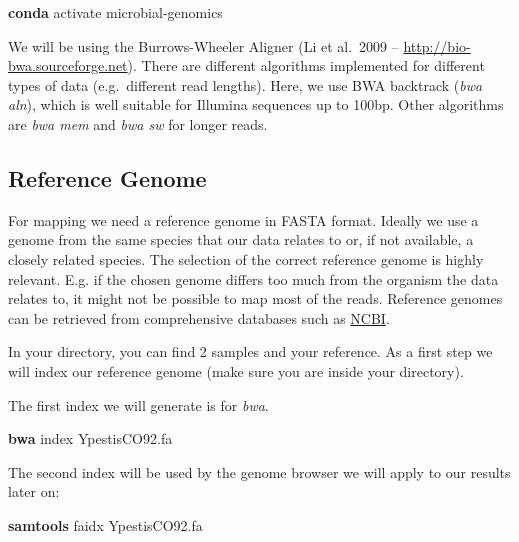 \documentclass[
  letterpaper,
]{book}
\newenvironment{Shaded}{}{}
\newcommand{\ExtensionTok}[1]{\textcolor[rgb]{0.84,0.23,0.29}{\textbf{#1}}}
\newcommand{\NormalTok}[1]{\textcolor[rgb]{0.14,0.16,0.18}{#1}}
\begin{document}
\begin{Shaded}
\begin{Highlighting}[]
\ExtensionTok{conda}\NormalTok{ activate microbial{-}genomics}
\end{Highlighting}
\end{Shaded}

We will be using the Burrows-Wheeler Aligner (Li et al.~2009 --
\url{http://bio-bwa.sourceforge.net}). There are different algorithms
implemented for different types of data (e.g.~different read lengths).
Here, we use BWA backtrack (\emph{bwa aln}), which is well suitable for
Illumina sequences up to 100bp. Other algorithms are \emph{bwa mem} and
\emph{bwa sw} for longer reads.

\hypertarget{reference-genome}{%
\subsection{Reference Genome}\label{reference-genome}}

For mapping we need a reference genome in FASTA format. Ideally we use a
genome from the same species that our data relates to or, if not
available, a closely related species. The selection of the correct
reference genome is highly relevant. E.g. if the chosen genome differs
too much from the organism the data relates to, it might not be possible
to map most of the reads. Reference genomes can be retrieved from
comprehensive databases such as
\href{https://www.ncbi.nlm.nih.gov/}{NCBI}.

In your directory, you can find 2 samples and your reference. As a first
step we will index our reference genome (make sure you are inside your
directory).

The first index we will generate is for \emph{bwa}.

\begin{Shaded}
\begin{Highlighting}[]
\ExtensionTok{bwa}\NormalTok{ index YpestisCO92.fa}
\end{Highlighting}
\end{Shaded}

The second index will be used by the genome browser we will apply to our
results later on:

\begin{Shaded}
\begin{Highlighting}[]
\ExtensionTok{samtools}\NormalTok{ faidx YpestisCO92.fa}
\end{Highlighting}
\end{Shaded}
\end{document}
